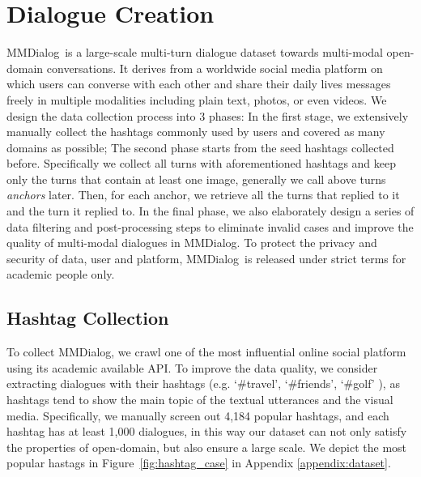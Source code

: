 \documentclass[11pt]{article}
\newcommand{\DataName}{MMDialog}
\begin{document}
 \section{Dialogue Creation}
\DataName~is a large-scale multi-turn dialogue dataset towards multi-modal open-domain conversations. It derives from a worldwide social media platform  on which users can converse with each other and share their daily lives messages freely in multiple modalities including plain text, photos, or even videos. We design the data collection process into 3 phases: In the first stage, we extensively manually collect the hashtags commonly used by users and covered as many domains as possible; The second phase starts from the seed hashtags collected before. Specifically we collect all turns with aforementioned hashtags and keep only the turns that contain at least one image, generally we call above turns \textit{anchors} later. Then, for each anchor, we retrieve all the turns that replied to it and the turn it replied to. In the final phase, we also elaborately design a series of data filtering and post-processing steps to eliminate invalid cases and improve the quality of multi-modal dialogues in \DataName. To protect the privacy and security of data, user and platform, \DataName~is released under strict terms for academic people only.


\subsection{Hashtag Collection}
To collect \DataName, we crawl one of the most influential online social platform using its academic available API. To improve the data quality, we consider extracting dialogues with their hashtags (e.g. `\#travel', `\#friends', `\#golf' ), as hashtags tend to show the main topic of the textual utterances and the visual media. Specifically, we manually screen out 4,184 popular hashtags, and each hashtag has at least 1,000 dialogues, in this way our dataset can not only satisfy the properties of open-domain, but also ensure a large scale. We depict the most popular hastags in Figure~\ref{fig:hashtag_case} in Appendix \ref{appendix:dataset}.
\end{document}
